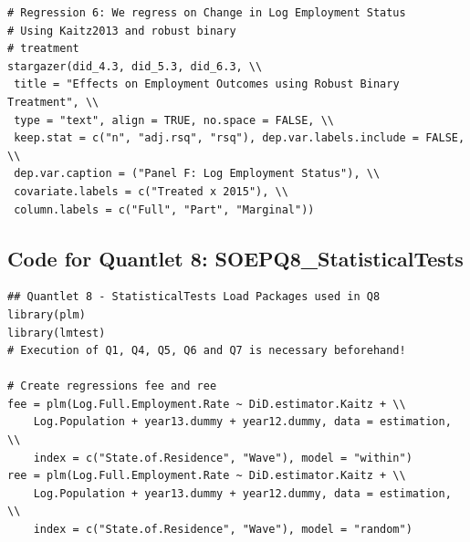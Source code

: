 \documentclass[a4paper]{article}
\begin{document}
{\begin{lstlisting}
# Regression 6: We regress on Change in Log Employment Status 
# Using Kaitz2013 and robust binary
# treatment
stargazer(did_4.3, did_5.3, did_6.3, \\ 
 title = "Effects on Employment Outcomes using Robust Binary Treatment", \\ 
 type = "text", align = TRUE, no.space = FALSE, \\ 
 keep.stat = c("n", "adj.rsq", "rsq"), dep.var.labels.include = FALSE, \\ 
 dep.var.caption = ("Panel F: Log Employment Status"), \\ 
 covariate.labels = c("Treated x 2015"), \\ 
 column.labels = c("Full", "Part", "Marginal"))
\end{lstlisting}
\newpage
\subsection{Code for Quantlet 8: SOEPQ8\_StatisticalTests}
\begin{lstlisting}
## Quantlet 8 - StatisticalTests Load Packages used in Q8
library(plm)
library(lmtest)
# Execution of Q1, Q4, Q5, Q6 and Q7 is necessary beforehand!

# Create regressions fee and ree
fee = plm(Log.Full.Employment.Rate ~ DiD.estimator.Kaitz + \\
	Log.Population + year13.dummy + year12.dummy, data = estimation, \\
	index = c("State.of.Residence", "Wave"), model = "within")
ree = plm(Log.Full.Employment.Rate ~ DiD.estimator.Kaitz + \\
	Log.Population + year13.dummy + year12.dummy, data = estimation, \\
	index = c("State.of.Residence", "Wave"), model = "random")


\end{lstlisting}}
\end{document}
